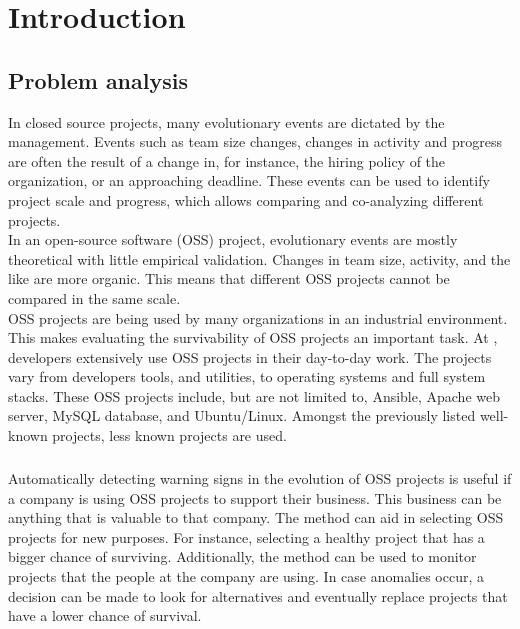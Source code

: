 \chapter{Introduction}
\label{introduction}

\section{Problem analysis}

In closed source projects, many evolutionary events are dictated by the
management.
Events such as team size changes, changes in activity and progress are often the
result of a change in, for instance, the hiring policy of the organization, or
an approaching deadline. These events can be used to identify project scale and
progress, which allows comparing and co-analyzing different projects.\\

In an open-source software (OSS) project, evolutionary events are mostly
theoretical with little empirical validation. Changes in team size, activity,
and the like are more organic. This means that different OSS projects cannot be
compared in the same scale.\\

OSS projects are being used by many organizations in an industrial environment.
This makes evaluating the survivability of OSS projects an important task.
At \theOrganization, developers extensively use OSS projects in their day-to-day
work. The projects vary from developers tools, and utilities, to operating
systems and full system stacks. These OSS projects include, but are not limited
to, Ansible, Apache web server, MySQL database, and Ubuntu/Linux. Amongst the
previously listed well-known projects, less known projects are used.

\paragraph{}
Automatically detecting warning signs in the evolution of OSS projects is useful
if a company is using OSS projects to support their business. This business can
be anything that is valuable to that company. The method can aid in selecting
OSS projects for new purposes. For instance, selecting a healthy project that
has a bigger chance of surviving.
Additionally, the method can be used to monitor projects that the people
at the company are using. In case anomalies occur, a decision can be made to
look for alternatives and eventually replace projects that have a lower chance
of survival.

